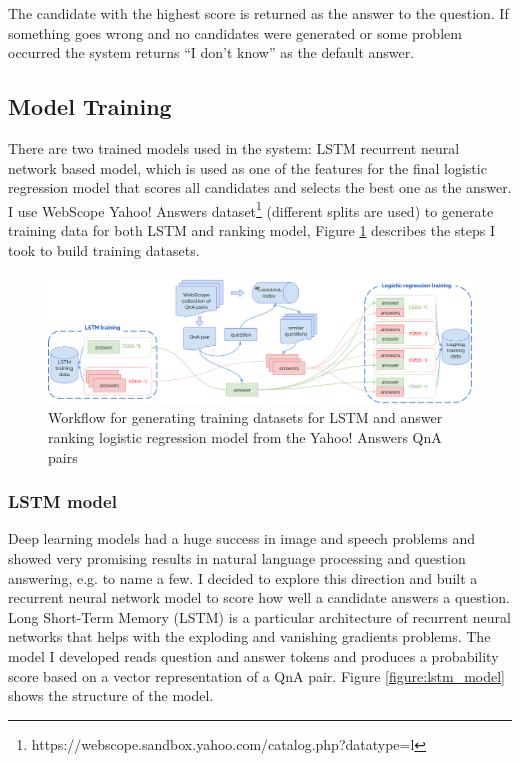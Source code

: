 \documentclass[]{article}
\begin{document}
The candidate with the highest score is returned as the answer to the question.
If something goes wrong and no candidates were generated or some problem occurred the system returns ``I don't know'' as the default answer.

\subsection{Model Training}

There are two trained models used in the system: LSTM recurrent neural network based model, which is used as one of the features for the final logistic regression model that scores all candidates and selects the best one as the answer.
I use WebScope Yahoo! Answers dataset\footnote{https://webscope.sandbox.yahoo.com/catalog.php?datatype=l} (different splits are used) to generate training data for both LSTM and ranking model, Figure \ref{figure:model_training} describes the steps I took to build training datasets.

\begin{figure}
	\includegraphics[width=470px]{img/model_training}
	\caption{Workflow for generating training datasets for LSTM and answer ranking logistic regression model from the Yahoo! Answers QnA pairs}
	\label{figure:model_training}
\end{figure}

\subsubsection{LSTM model}
\label{section:lstm}

Deep learning models had a huge success in image and speech problems and showed very promising results in natural language processing and question answering, e.g. \cite{yu2014deep,diwang_lstm_2015} to name a few.
I decided to explore this direction and built a recurrent neural network model to score how well a candidate answers a question.
Long Short-Term Memory (LSTM) \cite{hochreiter1997long} is a particular architecture of recurrent neural networks that helps with the exploding and vanishing gradients problems.
The model I developed reads question and answer tokens and produces a probability score based on a vector representation of a QnA pair.
Figure \ref{figure:lstm_model} shows the structure of the model.
\end{document}
